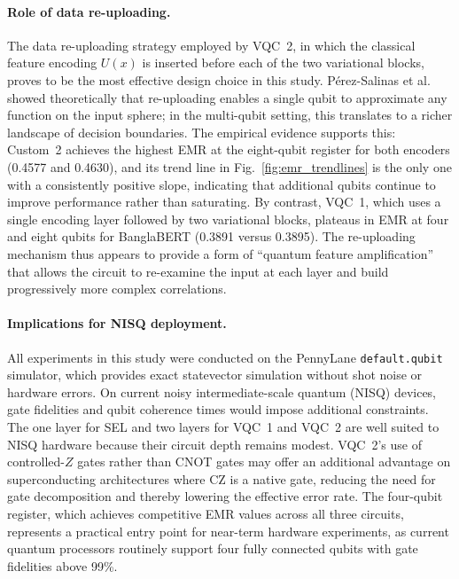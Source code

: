 \documentclass[runningheads]{llncs}
\begin{document}
\paragraph{Role of data re-uploading.}
The data re-uploading strategy employed by VQC~2, in which the classical feature encoding $U(x)$ is inserted before each of the two variational blocks, proves to be the most effective design choice in this study. P\'erez-Salinas et al.~\cite{perez2020data} showed theoretically that re-uploading enables a single qubit to approximate any function on the input sphere; in the multi-qubit setting, this translates to a richer landscape of decision boundaries. The empirical evidence supports this: Custom~2 achieves the highest EMR at the eight-qubit register for both encoders (0.4577 and 0.4630), and its trend line in Fig.~\ref{fig:emr_trendlines} is the only one with a consistently positive slope, indicating that additional qubits continue to improve performance rather than saturating. By contrast, VQC~1, which uses a single encoding layer followed by two variational blocks, plateaus in EMR at four and eight qubits for BanglaBERT (0.3891 versus 0.3895). The re-uploading mechanism thus appears to provide a form of ``quantum feature amplification'' that allows the circuit to re-examine the input at each layer and build progressively more complex correlations.

\paragraph{Implications for NISQ deployment.}
All experiments in this study were conducted on the PennyLane \texttt{default.qubit} simulator, which provides exact statevector simulation without shot noise or hardware errors. On current noisy intermediate-scale quantum (NISQ) devices, gate fidelities and qubit coherence times would impose additional constraints. The one layer for SEL and two layers for VQC~1 and VQC~2 are well suited to NISQ hardware because their circuit depth remains modest. VQC~2's use of controlled-$Z$ gates rather than CNOT gates may offer an additional advantage on superconducting architectures where CZ is a native gate, reducing the need for gate decomposition and thereby lowering the effective error rate. The four-qubit register, which achieves competitive EMR values across all three circuits, represents a practical entry point for near-term hardware experiments, as current quantum processors routinely support four fully connected qubits with gate fidelities above 99\%.
\end{document}
